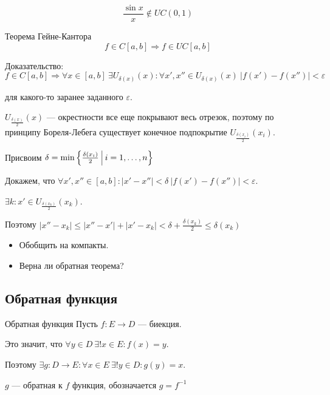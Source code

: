 \begin{example}{}{}
    \[
        \frac{\sin x}{x} \notin UC(0, 1)
    \]
\end{example}

\newpage

\begin{thrm}{Теорема Гейне-Кантора}{}
    \[
        f \in C[a, b] \Rightarrow f \in UC[a, b]
    \]
\end{thrm}

Доказательство:
\[
    f \in C[a, b] \Rightarrow \forall x \in [a, b] \ \exists U_{\delta(x)} (x) :
    \forall x', x'' \in U_{\delta(x)} (x) \ | f(x') - f(x'') | < \varepsilon
\]

для какого-то заранее заданного \( \varepsilon \).

\( U_{\frac{\delta(x)}{2}} (x) \) --- окрестности все еще покрывают весь отрезок,
поэтому по принципу Бореля-Лебега существует конечное подпокрытие \( U_{\frac{\delta(x_i)}{2}} (x_i) \).

Присвоим \( \delta = \min \left\{ \frac{\delta(x_i)}{2} \ \vline \ i = 1, \ldots, n \right\} \)

Докажем, что \( \forall x', x'' \in [a, b] : |x' - x''| < \delta \ |f(x') - f(x'')| < \varepsilon \).

\( \exists k : x' \in U_{\frac{\delta(x_k)}{2}} (x_k) \).

Поэтому \( |x'' - x_k| \leq |x'' - x'| + |x' - x_k| < \delta + \frac{\delta(x_k)}{2} \leq \delta(x_k) \)

\begin{exercise}{}{}
    \begin{itemize}
        \item
            Обобщить на компакты.
        \item
            Верна ли обратная теорема?
    \end{itemize}
\end{exercise}

\subsection{Обратная функция}

\begin{defn}{Обратная функция}{}
    Пусть \( f : E \to D \) --- биекция.

    Это значит, что \( \forall y \in D \ \exists ! x \in E : f(x) = y \).

    Поэтому \( \exists g : D \to E : \forall x \in E \ \exists ! y \in D : g(y) = x \).

    \( g \) --- обратная к \( f \) функция, обозначается \( g = f^{-1} \)
\end{defn}

